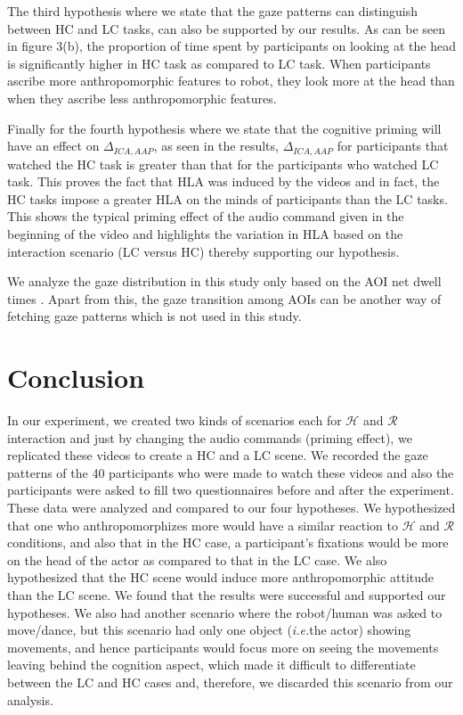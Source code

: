 \documentclass[a4,twocolumn,10pt]{article}
\newcommand{\ie}{{\textit{i.e.\xspace}}}
\begin{document}
The third hypothesis where we state that the gaze patterns can distinguish
between HC and LC tasks, can also be supported by our results. As can be seen in
figure 3(b), the proportion of time spent by participants on looking at the head
is significantly higher in HC task as compared to LC task. When participants
ascribe more anthropomorphic features to robot, they look more at the head than
when they ascribe less anthropomorphic features.

Finally for the fourth hypothesis where we state that the cognitive priming will
have an effect on $\Delta_{ICA,AAP}$, as seen in the results, $\Delta_{ICA,AAP}$
for participants that watched the HC task is greater than that for the
participants who watched LC task. This proves the fact that HLA was induced by
the videos and in fact, the HC tasks impose a greater HLA on the minds of
participants than the LC tasks. This shows the typical priming effect of the
audio command given in the beginning of the video and highlights the variation
in HLA based on the interaction scenario (LC versus HC) thereby supporting our
hypothesis. 

We analyze the gaze distribution in this study only based on the AOI net dwell
times . Apart from this, the gaze transition among AOIs can be another way of
fetching gaze patterns which is not used in this study.

\section{Conclusion}

In our experiment, we created two kinds of scenarios each for $\mathcal{H}$ and
$\mathcal{R}$ interaction and just by changing the audio commands (priming
effect), we replicated these videos to create a HC and a LC scene. We recorded
the gaze patterns of the 40 participants who were made to watch these videos and
also the participants were asked to fill two questionnaires before and after the
experiment. These data were analyzed and compared to our four hypotheses. We
hypothesized that one who anthropomorphizes more would have a similar reaction
to $\mathcal{H}$ and $\mathcal{R}$ conditions, and also that in the HC case, a
participant's fixations would be more on the head of the actor as compared to
that in the LC case. We also hypothesized that the HC scene would induce more
anthropomorphic attitude than the LC scene. We found that the results were
successful and supported our hypotheses. We also had another scenario where the
robot/human was asked to move/dance, but this scenario had only one object
(\ie the actor) showing movements, and hence participants would focus
more on seeing the movements leaving behind the cognition aspect, which made it
difficult to differentiate between the LC and HC cases and, therefore, we
discarded this scenario from our analysis.





%
%
\end{document}
